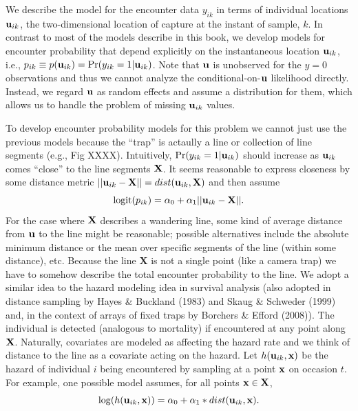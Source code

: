 We describe the model for the encounter data 
$y_{ik}$ in terms of individual locations ${\bf u}_{ik}$, the two-dimensional location of
capture at the instant of sample, $k$. In contrast to most of the models describe in this book, we
develop
 models for encounter probability that depend
explicitly on the instantaneous location ${\bf u}_{ik}$, i.e., $p_{ik} \equiv p({\bf u}_{ik}) =
\Pr(y_{ik}=1|{\bf u}_{ik})$.  Note that ${\bf u}$ is unobserved for
the $y=0$ observations and thus we cannot analyze the
conditional-on-${\bf u}$ likelihood directly. Instead, we regard ${\bf
  u}$ as random effects and assume a distribution for them, which
allows us to handle the problem of missing ${\bf u}_{ik}$ values.

To develop encounter probability models for this problem we cannot
just use the previous models because the ``trap'' is actaully a line
or collection of line segments (e.g., Fig XXXX).
Intuitively, $\Pr(y_{ik}=1|{\bf u}_{ik})$ should increase as ${\bf
  u}_{ik}$ comes ``close'' to the line segments ${\bf X}$. It seems
reasonable to express closeness by some distance metric $|| {\bf
  u}_{ik} - {\bf X} || = dist( {\bf u}_{ik}, {\bf X})$ and then assume
\[
\mbox{logit}(p_{ik}) = \alpha_{0} + \alpha_{1} || {\bf u}_{ik} - {\bf X} ||.
\]
For the case where ${\bf X}$ describes a wandering line, some
kind of average distance from ${\bf u}$ to the line
might be reasonable; possible alternatives include the absolute
minimum distance or the mean over specific segments
of the line (within some distance), etc.
Because the line {\bf X} is not a single point (like a camera trap) we have to somehow describe
the total encounter probability to the line. We adopt a similar idea
to the hazard modeling idea in survival analysis (also adopted in
distance sampling by Hayes \& Buckland (1983) and Skaug \& Schweder
(1999) and, in the context of arrays of fixed traps by Borchers \&
Efford (2008)).  The individual is detected (analogous to mortality)
if encountered at any point along ${\bf X}$. Naturally, covariates are
modeled as affecting the hazard rate and we think of distance to the
line as a covariate acting on the hazard. Let $h({\bf u}_{ik},{\bf
  x})$ be the hazard of individual $i$ being encountered by sampling
at a point ${\bf x}$ on occasion $t$.  For example, one possible model
assumes, for all points ${\bf x} \in {\bf X}$,
\begin{equation}
\log(h({\bf u}_{ik},{\bf x})) = \alpha_{0} + \alpha_{1}*dist({\bf u}_{ik},{\bf x}).
\label{eq.hazard}
\end{equation}
